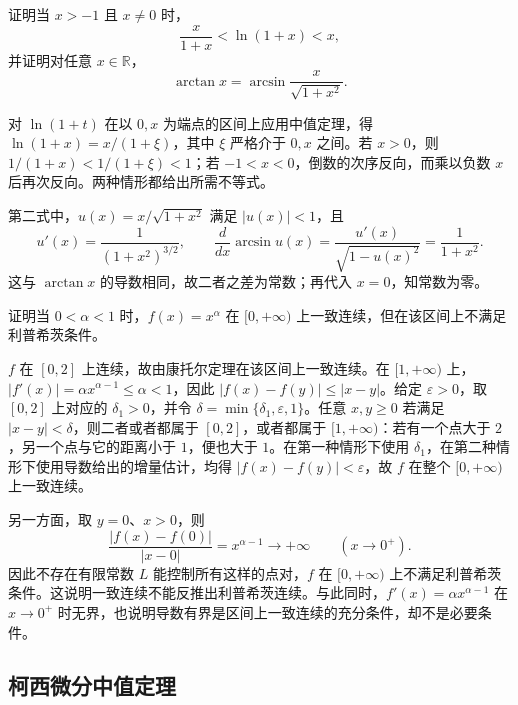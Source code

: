 \begin{example}
\label{ex:mean-value-logarithm-and-identity}
证明当 $x>-1$ 且 $x\neq0$ 时，
\[
    \frac{x}{1+x}<\ln(1+x)<x,
\]
并证明对任意 $x\in\mathbb{R}$，
\[
    \arctan x=\arcsin\frac{x}{\sqrt{1+x^2}}.
\]
\end{example}

\begin{solve}
对 $\ln(1+t)$ 在以 $0,x$ 为端点的区间上应用中值定理，得 $\ln(1+x)=x/(1+\xi)$，其中 $\xi$ 严格介于 $0,x$ 之间。若 $x>0$，则 $1/(1+x)<1/(1+\xi)<1$；若 $-1<x<0$，倒数的次序反向，而乘以负数 $x$ 后再次反向。两种情形都给出所需不等式。

第二式中，$u(x)=x/\sqrt{1+x^2}$ 满足 $|u(x)|<1$，且
\[
    u'(x)=\frac1{(1+x^2)^{3/2}},\qquad
    \frac{d}{dx}\arcsin u(x)
    =\frac{u'(x)}{\sqrt{1-u(x)^2}}=\frac1{1+x^2}.
\]
这与 $\arctan x$ 的导数相同，故二者之差为常数；再代入 $x=0$，知常数为零。
\end{solve}

\begin{example}
\label{ex:power-function-uniform-continuity-by-mean-value}
证明当 $0<\alpha<1$ 时，$f(x)=x^\alpha$ 在 $[0,+\infty)$ 上一致连续，但在该区间上不满足利普希茨条件。
\end{example}

\begin{solve}
$f$ 在 $[0,2]$ 上连续，故由康托尔定理在该区间上一致连续。在 $[1,+\infty)$ 上，$|f'(x)|=\alpha x^{\alpha-1}\leq\alpha<1$，因此 $|f(x)-f(y)|\leq|x-y|$。给定 $\varepsilon>0$，取 $[0,2]$ 上对应的 $\delta_1>0$，并令 $\delta=\min\{\delta_1,\varepsilon,1\}$。任意 $x,y\geq0$ 若满足 $|x-y|<\delta$，则二者或者都属于 $[0,2]$，或者都属于 $[1,+\infty)$：若有一个点大于 $2$，另一个点与它的距离小于 $1$，便也大于 $1$。在第一种情形下使用 $\delta_1$，在第二种情形下使用导数给出的增量估计，均得 $|f(x)-f(y)|<\varepsilon$，故 $f$ 在整个 $[0,+\infty)$ 上一致连续。

另一方面，取 $y=0$、$x>0$，则
\[
    \frac{|f(x)-f(0)|}{|x-0|}=x^{\alpha-1}\longrightarrow+\infty
    \qquad(x\to0^+).
\]
因此不存在有限常数 $L$ 能控制所有这样的点对，$f$ 在 $[0,+\infty)$ 上不满足利普希茨条件。这说明一致连续不能反推出利普希茨连续。与此同时，$f'(x)=\alpha x^{\alpha-1}$ 在 $x\to0^+$ 时无界，也说明导数有界是区间上一致连续的充分条件，却不是必要条件。
\end{solve}

\subsection{柯西微分中值定理}
\label{subsec:cauchy-mean-value-theorem}

